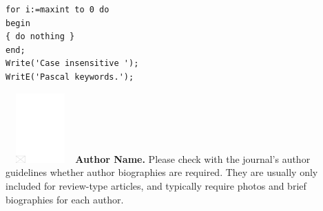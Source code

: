 \documentclass[APA,Times1COL]{WileyNJDv5} %
\begin{document}
\begin{lstlisting}[caption={Descriptive caption text},label=DescriptiveLabel, basicstyle=\fontsize{8}{10}\selectfont\ttfamily]
for i:=maxint to 0 do
begin
{ do nothing }
end;
Write('Case insensitive ');
WritE('Pascal keywords.');
\end{lstlisting}




\nocite{*}%



\begin{biography}{\includegraphics[width=76pt,height=76pt,draft]{empty}}{
{\textbf{Author Name.} Please check with the journal's author guidelines whether
author biographies are required. They are usually only included for
review-type articles, and typically require photos and brief
biographies for each author.}}
\end{biography}
\end{document}
